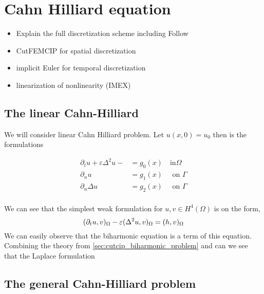 
\newpage
\section{Cahn Hilliard equation }%
\label{sec:cahn_hilliard_equation}


\begin{itemize}
    \item Explain the full discretization scheme including Follow \cite{feng2007fully}
    \item CutFEMCIP for spatial discretization
    \item implicit Euler for temporal discretization
    \item linearization of nonlinearity (IMEX)
\end{itemize}


\subsection{The linear Cahn-Hilliard}%

We will consider linear Cahn Hilliard problem. Let $ u( x,0) =  u_{0}$ then is the formulations

\begin{equation}
\label{eq:ch_exact}
    \begin{split}
        \partial _{t} u  + \varepsilon \Delta^2   u -   & =  g_{0}(x)  \quad \text{in} \Omega \\
        \partial _{n} u & =  g_{1}(x)  \quad \text{ on } \Gamma \\
         \partial _{n} \Delta u & = g_{2}(x)  \quad \text{ on } \Gamma  \\
    \end{split}
\end{equation}



We can see that the simplest weak formulation for $u,v \in H^{4}( \Omega ) $ is on the form,
\[
( \partial _{t}u, v )_{\Omega }  - \varepsilon ( \Delta^2 u, v)_{\Omega } = ( h,v)_{\Omega }   \\
\]
We can easily observe that the biharmonic equation is a term of this equation. Combining the theory from \ref{sec:cutcip_biharmonic_problem} and can we see that the Laplace formulation



\subsection{The general Cahn-Hilliard problem}%
\label{sub:the_problem}

